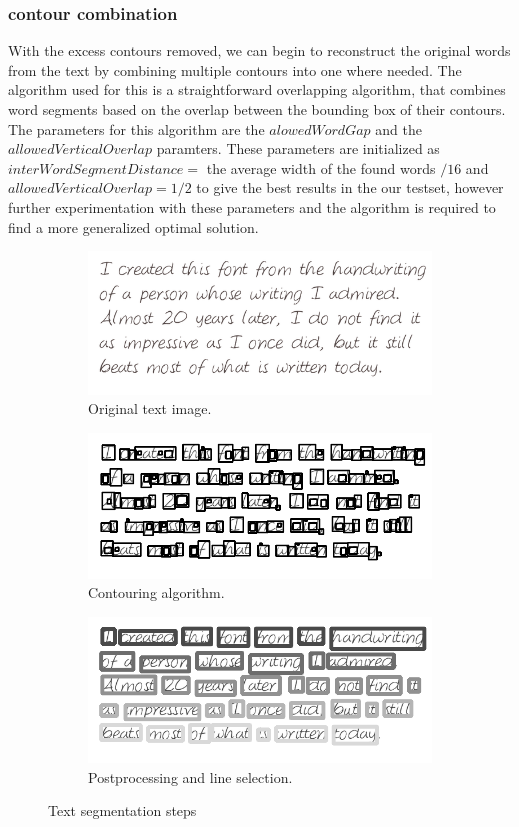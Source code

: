 \documentclass{article}
\begin{document}
\subsubsection{contour combination}
With the excess contours removed, we can begin to reconstruct the original words from the text by combining multiple contours into one where needed.
The algorithm used for this is a straightforward overlapping algorithm, that combines word segments based on the overlap between the bounding box of their contours.
The parameters for this algorithm are the $alowedWordGap$ and the $allowedVerticalOverlap$ paramters.
These parameters are initialized as $interWordSegmentDistance = $ the average width of the found words $ / 16 $ and $allowedVerticalOverlap = 1/2$ to give the best results in the our testset, however further experimentation with these parameters and the algorithm is required to find a more generalized optimal solution.

\begin{figure}
    \begin{subfigure}{\linewidth}
    \centering
    \includegraphics[width=.7\linewidth]{images/text}
    \vspace{-5px}
    \caption*{Original text image.}
    \end{subfigure}
    \begin{subfigure}{\linewidth}
    \centering
    \includegraphics[width=.7\linewidth]{images/cont}
    \vspace{-5px}
    \caption*{Contouring algorithm.}
    \end{subfigure}
    \begin{subfigure}{\linewidth}
    \centering
    \includegraphics[width=.7\linewidth]{images/lines}
    \vspace{-5px}
    \caption*{Postprocessing and line selection.}
    \end{subfigure}
    \vspace{-10px}
    \caption{Text segmentation steps}
    \label{fig:text_segm}
\end{figure}
\end{document}
